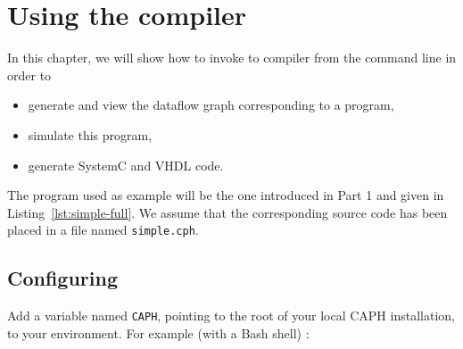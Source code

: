 
\chapter{Using the \caphc compiler}
\label{cha:cl-basic}

In this chapter, we will show how to invoke to \caphc compiler from the command line in order to
\begin{itemize}
\item generate and view the dataflow graph corresponding to a program,
\item simulate this program,
\item generate SystemC and VHDL code.
\end{itemize}

The program used as example will be the one introduced in Part 1 and given in
Listing~\ref{lst:simple-full}. We assume that the corresponding source code has been placed in a
file named \verb|simple.cph|. 

\section{Configuring}
\label{sec:cl-conf}

Add a variable named \verb|CAPH|, pointing to the root of your local CAPH installation, to your
environment. For example (with a Bash shell) : 

